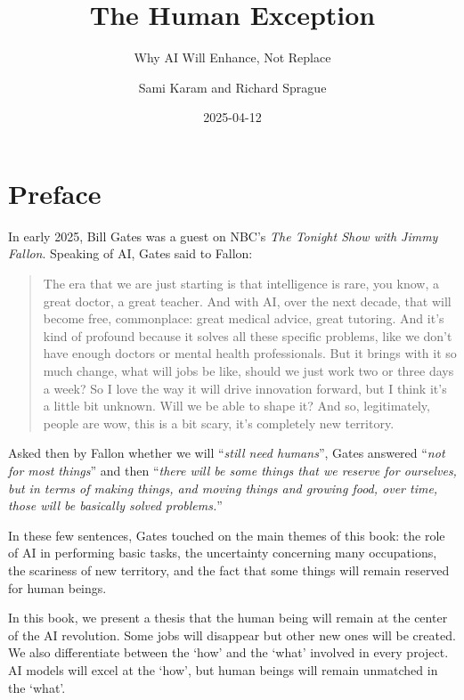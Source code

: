 \documentclass[
  Letterpaper,
]{scrbook}
\title{The Human Exception}
\subtitle{Why AI Will Enhance, Not Replace}
\author{Sami Karam and Richard Sprague}
\date{2025-04-12}
\renewcommand*\contentsname{Table of contents}
\newcommand\contentsname{Table of contents}
\begin{document}
\frontmatter
\maketitle

\renewcommand*\contentsname{Table of contents}
{
\setcounter{tocdepth}{2}
\tableofcontents
}

\mainmatter
{}

\chapter*{Preface}\label{preface}


In early 2025, Bill Gates was a guest on NBC's \emph{The Tonight Show
with Jimmy Fallon}. Speaking of AI, Gates said to Fallon:

\begin{quote}
The era that we are just starting is that intelligence is rare, you
know, a great doctor, a great teacher. And with AI, over the next
decade, that will become free, commonplace: great medical advice, great
tutoring. And it's kind of profound because it solves all these specific
problems, like we don't have enough doctors or mental health
professionals. But it brings with it so much change, what will jobs be
like, should we just work two or three days a week? So I love the way it
will drive innovation forward, but I think it's a little bit unknown.
Will we be able to shape it? And so, legitimately, people are wow, this
is a bit scary, it's completely new territory.
\end{quote}

Asked then by Fallon whether we will ``\emph{still need humans}'', Gates
answered ``\emph{not for most things}'' and then ``\emph{there will be
some things that we reserve for ourselves, but in terms of making
things, and moving things and growing food, over time, those will be
basically solved problems.}''

In these few sentences, Gates touched on the main themes of this book:
the role of AI in performing basic tasks, the uncertainty concerning
many occupations, the scariness of new territory, and the fact that some
things will remain reserved for human beings.

In this book, we present a thesis that the human being will remain at
the center of the AI revolution. Some jobs will disappear but other new
ones will be created. We also differentiate between the `how' and the
`what' involved in every project. AI models will excel at the `how', but
human beings will remain unmatched in the `what'.
\end{document}
